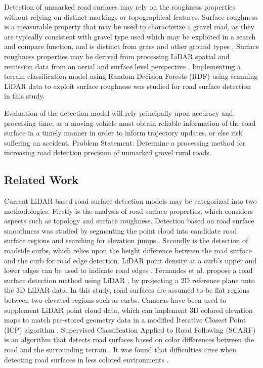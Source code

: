 \documentclass[journal,onecolumn]{IEEEtran}
\begin{document}
	{Detection of unmarked road surfaces may rely on the roughness properties without relying on distinct markings or topographical features. Surface roughness is a measurable property that may be used to characterize a gravel road, as they are typically consistent with gravel type used \cite{skorseth_gravel_nodate} which may be exploited in a search and compare function, and is distinct from grass and other ground types \cite{wan_road_2007, levi_3d_2012_light, levi_3d_2012_terrain}. Surface roughness properties may be derived from processing LiDAR spatial and remission data from an aerial and surface level perspective \cite{wan_road_2007, levi_3d_2012_light, levi_3d_2012_terrain, pollyea_experimental_2012,rychkov_computational_2012,lague_accurate_2013,brubaker_use_2013,turner_estimation_2014,campbell_lidar-based_2017,shepard_roughness_2001,tegowski_statistical_2016,sock_probabilistic_2016,milenkovic_roughness_2018,yadav_extraction_2017, yadav_rural_2018}. Implementing a terrain classification model using Random Decision Forests (RDF) using scanning LiDAR data to exploit surface roughness was studied for road surface detection in this study.}
		
	{Evaluation of the detection model will rely principally upon accuracy and processing time, as a moving vehicle must obtain reliable information of the road surface in a timely manner in order to inform trajectory updates, or else risk suffering an accident. Problem Statement: Determine a processing method for increasing road detection precision of unmarked gravel rural roads.}
		
\subsection{Related Work}
	
	{Current LiDAR based road surface detection models may be categorized into two methodologies. Firstly is the analysis of road surface properties, which considers aspects such as topology and surface roughness. Detection based on road surface smoothness was studied by segmenting the point cloud into candidate road surface regions and searching for elevation jumps \cite{liu_new_2013}. Secondly is the detection of roadside curbs, which relies upon the height difference between the road surface and the curb for road edge detection. LiDAR point density at a curb's upper and lower edges can be used to indicate road edges \cite{ibrahim_curb-based_2012}. Fernandes et al. propose a road surface detection method using LiDAR \cite{fernandes_road_2014}, by projecting a 2D reference plane unto the 3D LiDAR data. In this study, road surfaces are assumed to be flat regions between two elevated regions such as curbs. Cameras have been used to supplement LiDAR point cloud data, which can implement 3D colored elevation maps to match pre-stored geometry data in a modified Iterative Closest Point (ICP) algorithm \cite{manz_detection_2011}. Supervised Classification Applied to Road Following (SCARF) is an algorithm that detects road surfaces based on color differences between the road and the surrounding terrain \cite{crisman_scarf_1993}. It was found that difficulties arise when detecting road surfaces in less colored environments \cite{crisman_scarf_1993,manz_detection_2011}.}
	
\end{document}

